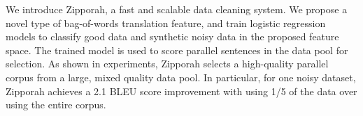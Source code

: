 We introduce Zipporah, a fast and scalable data cleaning system. We propose a novel type of bag-of-words translation feature, and train logistic regression models to classify good data and synthetic noisy data in the proposed feature space. The trained model is used to score parallel sentences in the data pool for selection. As shown in experiments, Zipporah selects a high-quality parallel corpus from a large, mixed quality data pool. In particular, for one noisy dataset, Zipporah achieves a 2.1 BLEU score improvement with using 1/5 of the data over using the entire corpus.
